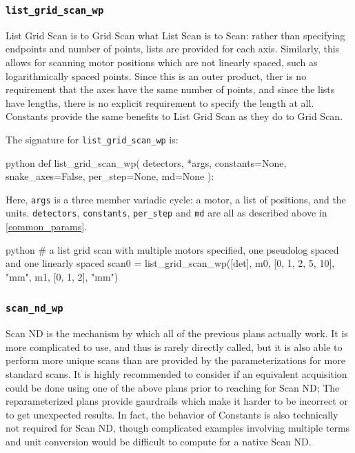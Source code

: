 \subsubsection{\texttt{list\_grid\_scan\_wp}}

List Grid Scan is to Grid Scan what List Scan is to Scan: rather than specifying endpoints and number of points, lists are provided for each axis.
Similarly, this allows for scanning motor positions which are not linearly spaced, such as logarithmically spaced points.
Since this is an outer product, ther is no requirement that the axes have the same number of points, and since the lists have lengths, there is no explicit requirement to specify the length at all.
Constants provide the same benefits to List Grid Scan as they do to Grid Scan.

The signature for \texttt{list\_grid\_scan\_wp} is:

\begin{codefragment}{python}
def list_grid_scan_wp(
    detectors, *args, constants=None, snake_axes=False, per_step=None, md=None
):
\end{codefragment}

Here, \texttt{args} is a three member variadic cycle: a motor, a list of positions, and the units.
\texttt{detectors}, \texttt{constants}, \texttt{per\_step} and \texttt{md} are all as described above in \ref{common_params}.

\begin{codefragment}{python}
# a list grid scan with multiple motors specified, one pseudolog spaced and one linearly spaced
scan0 = list_grid_scan_wp([det], m0, [0, 1, 2, 5, 10], "mm",
                                 m1, [0, 1, 2], "mm")
\end{codefragment}

\subsubsection{\texttt{scan\_nd\_wp}}

Scan ND is the mechanism by which all of the previous plans actually work.
It is more complicated to use, and thus is rarely directly called, but it is also able to perform more unique scans than are provided by the parameterizations for more standard scans.
It is highly recommended to consider if an equivalent acquisition could be done using one of the above plans prior to reaching for Scan ND; The reparameterized plans provide gaurdrails which make it harder to be incorrect or to get unexpected results.
In fact, the behavior of Constants is also technically not required for Scan ND, though complicated examples involving multiple terms and unit conversion would be difficult to compute for a native Scan ND.

